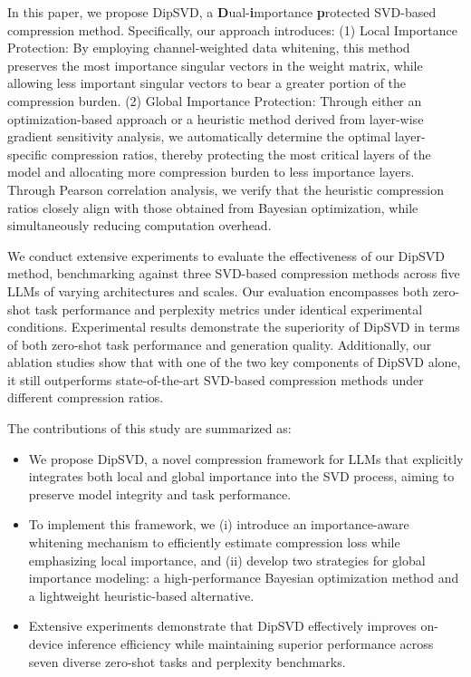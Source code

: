 \documentclass[11pt]{article}
\begin{document}
In this paper, we propose DipSVD, a \textbf{D}ual-\textbf{i}mportance \textbf{p}rotected SVD-based compression method. Specifically, our approach introduces: (1) Local Importance Protection: By employing channel-weighted data whitening, this method preserves the most importance singular vectors in the weight matrix, while allowing less important singular vectors to bear a greater portion of the compression burden. (2) Global Importance Protection: Through either an optimization-based approach or a heuristic method derived from layer-wise gradient sensitivity analysis, we automatically determine the optimal layer-specific compression ratios, thereby protecting the most critical layers of the model and allocating more compression burden to less importance layers. Through Pearson correlation analysis, we verify that the heuristic compression ratios closely align with those obtained from Bayesian optimization, while simultaneously reducing computation overhead. 

We conduct extensive experiments to evaluate the effectiveness of our DipSVD method, benchmarking against three SVD-based compression methods across five LLMs of varying architectures and scales. Our evaluation encompasses both zero-shot task performance and perplexity metrics under identical experimental conditions. Experimental results demonstrate the superiority of DipSVD in terms of both zero-shot task performance and generation quality. Additionally, our ablation studies show that with one of the two key components of DipSVD alone, it still outperforms state-of-the-art SVD-based compression methods under different compression ratios.

The contributions of this study are summarized as:
\begin{itemize}
\item We propose DipSVD, a novel compression framework for LLMs that explicitly integrates both local and global importance into the SVD process, aiming to preserve model integrity and task performance.
\item To implement this framework, we (i) introduce an importance-aware whitening mechanism to efficiently estimate compression loss while emphasizing local importance, and (ii) develop two strategies for global importance modeling: a high-performance Bayesian optimization method and a lightweight heuristic-based alternative.

\item Extensive experiments demonstrate that DipSVD effectively improves on-device inference efficiency while maintaining superior performance across seven diverse zero-shot tasks and perplexity benchmarks.

\end{itemize}
\end{document}

